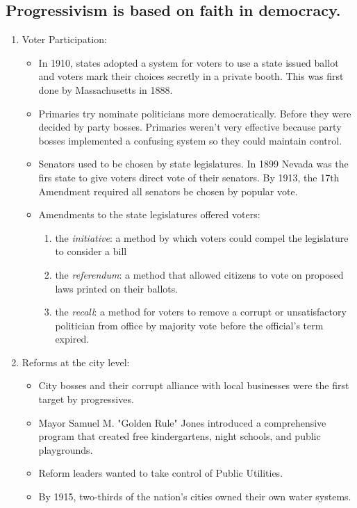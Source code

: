 \documentclass[12pt]{article} %
\begin{document}
\subsection{Progressivism is based on faith in democracy.}
\begin{enumerate}
	\item Voter Participation:
	\begin{itemize}
		\item In 1910, states adopted a system for voters to use a state issued ballot and voters 
			mark their choices secretly in a private booth. This was first done by Massachusetts in
			1888. 
		\item Primaries try nominate politicians more democratically. Before they were decided by 
			party bosses. Primaries weren't very effective because party bosses implemented a 
			confusing system so they could maintain control.
		\item Senators used to be chosen by state legislatures. In 1899 Nevada was the firs state to
			give voters direct vote of their senators. By 1913, the 17th Amendment required all 
			senators be chosen by popular vote.
		\item Amendments to the state legislatures offered voters:
		\begin{enumerate}
			\item the \textit{initiative}: a method by which voters could compel the legislature to
				consider a bill
			\item the \textit{referendum}: a method that allowed citizens to vote on proposed laws 
				printed on their ballots.
			\item the \textit{recall}: a method for voters to remove a corrupt or unsatisfactory
				politician from office by majority vote before the official's term expired.
		\end{enumerate}
	\end{itemize}
	\item Reforms at the city level:
	\begin{itemize}
		\item City bosses and their corrupt alliance with local businesses were the first target by
			progressives.
		\item Mayor Samuel M. "Golden Rule" Jones introduced a comprehensive program that created 
			free kindergartens, night schools, and public playgrounds.
		\item Reform leaders wanted to take control of Public Utilities.
		\item By 1915, two-thirds of the nation's cities owned their own water systems.

\end{itemize}
\end{enumerate}
\end{document}
